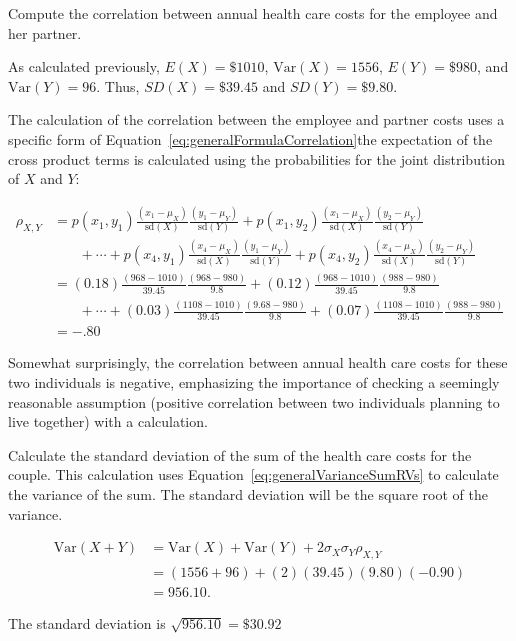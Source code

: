 \begin{example}{Compute the correlation between annual health care costs for the employee and her partner.} 
	
	As calculated previously, $E(X) = \$1010$, $\textrm{Var}(X) = 1556$, $E(Y) = \$980$, and $\textrm{Var}(Y)= 96$. Thus, $SD(X) = \$39.45$ and $SD(Y) = \$9.80$.
	
	The calculation of the correlation between the employee and partner costs uses a specific form of Equation~\ref{eq:generalFormulaCorrelation}\textemdash the expectation of the cross product terms is calculated using the probabilities for the joint distribution of $X$ and $Y$:
	
	\begin{align*}
	\rho_{X,Y} &= p(x_1,y_1) \frac{(x_1 - \mu_X)}{\textrm{sd}(X)}\frac{(y_1 - \mu_Y)}{\textrm{sd}(Y)} 
	+ p(x_1,y_2)\frac{(x_1 - \mu_X)}{\textrm{sd}(X)}\frac{(y_2 - \mu_Y)}{\textrm{sd}(Y)}  \\
	&\phantom{{}=1} + \cdots + p(x_4,y_1)\frac{(x_4 - \mu_X)}{\textrm{sd}(X)}\frac{(y_1 - \mu_Y)}{\textrm{sd}(Y)} + p(x_4,y_2)\frac{(x_4 - \mu_X)}{\textrm{sd}(X)}\frac{(y_2 - \mu_Y)}{\textrm{sd}(Y)} \\
	&= (0.18) \frac{(968 - 1010)}{39.45}\frac{(968 - 980)}{9.8} 
	+ (0.12)\frac{(968 - 1010)}{39.45}\frac{(988 - 980)}{9.8}  \\
	&\phantom{{}=1} + \cdots + (0.03)\frac{(1108 - 1010)}{39.45}\frac{(9.68 - 980)}{9.8} + (0.07)\frac{(1108 - 1010)}{39.45}\frac{(988 - 980)}{9.8} \\
	&= -.80
	\end{align*} 
	
	Somewhat surprisingly, the correlation between annual health care costs for these two individuals is negative, emphasizing the importance of checking a seemingly reasonable assumption (positive correlation between two individuals planning to live together) with a calculation.
\end{example}


\begin{example}{Calculate the standard deviation of the sum of the health care costs for the couple.}
	This calculation uses Equation~\ref{eq:generalVarianceSumRVs} to calculate the variance of the sum.  The standard deviation will be the square root of the variance.
	
	\begin{align*} 
	\text{Var}(X + Y) &= \text{Var}(X) + \text{Var}(Y) + 
	2 \sigma_X \sigma_Y \rho_{X,Y} \\
	&= (1556 + 96) + (2)(39.45)(9.80)(-0.90) \\
	& = 956.10.
	\end{align*}
	
	The standard deviation is $\sqrt{956.10} = \$30.92$
	
\end{example}

